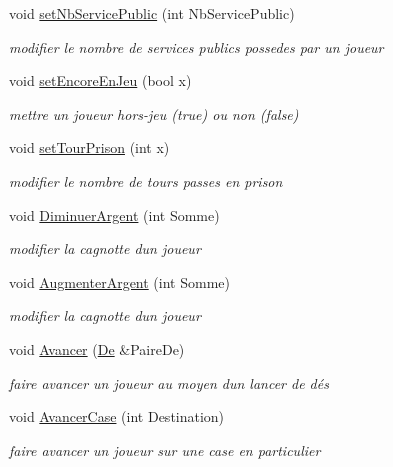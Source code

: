 \begin{DoxyCompactItemize}
void \hyperlink{classJoueur_ae3d9c066fa56dfbdc93eebd2ffb14f53}{set\+Nb\+Service\+Public} (int Nb\+Service\+Public)
\begin{DoxyCompactList}\small\item\em modifier le nombre de services publics possedes par un joueur \end{DoxyCompactList}\item 
void \hyperlink{classJoueur_a019e018f64e0ece74ce0133e394c9da7}{set\+Encore\+En\+Jeu} (bool x)
\begin{DoxyCompactList}\small\item\em mettre un joueur hors-\/jeu (true) ou non (false) \end{DoxyCompactList}\item 
void \hyperlink{classJoueur_ad27c6fe263fbbcc37f506af658820c66}{set\+Tour\+Prison} (int x)
\begin{DoxyCompactList}\small\item\em modifier le nombre de tours passes en prison \end{DoxyCompactList}\item 
void \hyperlink{classJoueur_a261fbab4596ebac8171122ebab8238d8}{Diminuer\+Argent} (int Somme)
\begin{DoxyCompactList}\small\item\em modifier la cagnotte d\textquotesingle{}un joueur \end{DoxyCompactList}\item 
void \hyperlink{classJoueur_aee0a14e1fcbf775925c2345bb0cc7294}{Augmenter\+Argent} (int Somme)
\begin{DoxyCompactList}\small\item\em modifier la cagnotte d\textquotesingle{}un joueur \end{DoxyCompactList}\item 
void \hyperlink{classJoueur_a88a74f33436855d7068afc8571371f2b}{Avancer} (\hyperlink{classDe}{De} \&Paire\+De)
\begin{DoxyCompactList}\small\item\em faire avancer un joueur au moyen d\textquotesingle{}un lancer de dés \end{DoxyCompactList}\item 
void \hyperlink{classJoueur_ab3f96bf4e675c0424e1910ad0b426fc5}{Avancer\+Case} (int Destination)
\begin{DoxyCompactList}\small\item\em faire avancer un joueur sur une case en particulier \end{DoxyCompactList}\item 

\end{DoxyCompactItemize}
